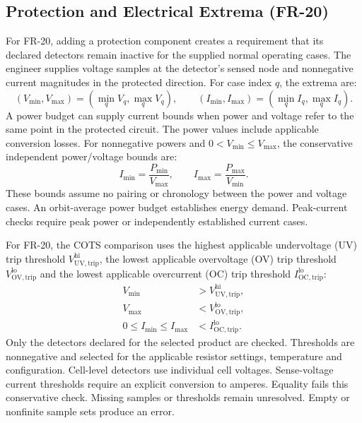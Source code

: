 \subsection{Protection and Electrical Extrema (FR-20)}
For FR-20, adding a protection component creates a requirement that its declared detectors remain inactive for the supplied normal operating cases. The engineer supplies voltage samples at the detector's sensed node and nonnegative current magnitudes in the protected direction. For case index $q$, the extrema are:
\begin{equation}
    (V_{\min},V_{\max})=(\min_q V_q,\max_q V_q),
    \qquad (I_{\min},I_{\max})=(\min_q I_q,\max_q I_q).
    \label{eq:electrical-operating-extrema}
\end{equation}
A power budget can supply current bounds when power and voltage refer to the same point in the protected circuit. The power values include applicable conversion losses. For nonnegative powers and $0<V_{\min}\leq V_{\max}$, the conservative independent power/voltage bounds are:
\begin{equation}
    I_{\min}=\frac{P_{\min}}{V_{\max}},
    \qquad I_{\max}=\frac{P_{\max}}{V_{\min}}.
    \label{eq:power-budget-current-extrema}
\end{equation}
These bounds assume no pairing or chronology between the power and voltage cases. An orbit-average power budget establishes energy demand. Peak-current checks require peak power or independently established current cases.

For FR-20, the COTS comparison uses the highest applicable undervoltage (UV) trip threshold $V_{\mathrm{UV,trip}}^{\mathrm{hi}}$, the lowest applicable overvoltage (OV) trip threshold $V_{\mathrm{OV,trip}}^{\mathrm{lo}}$ and the lowest applicable overcurrent (OC) trip threshold $I_{\mathrm{OC,trip}}^{\mathrm{lo}}$:
\begin{equation}
    \begin{aligned}
        V_{\min}&>V_{\mathrm{UV,trip}}^{\mathrm{hi}},\\
        V_{\max}&<V_{\mathrm{OV,trip}}^{\mathrm{lo}},\\
        0\leq I_{\min}\leq I_{\max}&<I_{\mathrm{OC,trip}}^{\mathrm{lo}}.
    \end{aligned}
    \label{eq:protection-no-trip}
\end{equation}
Only the detectors declared for the selected product are checked. Thresholds are nonnegative and selected for the applicable resistor settings, temperature and configuration. Cell-level detectors use individual cell voltages. Sense-voltage current thresholds require an explicit conversion to amperes. Equality fails this conservative check. Missing samples or thresholds remain unresolved. Empty or nonfinite sample sets produce an error.

